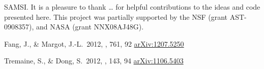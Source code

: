 \documentclass[12pt,preprint]{aastex}
\begin{document}
\acknowledgments
SAMSI. %
It is a pleasure to thank
    \ldots
for helpful contributions to the ideas and code presented here.
This project was partially supported by the NSF (grant AST-0908357), and NASA
(grant NNX08AJ48G).

\newcommand{\arxiv}[1]{\href{http://arxiv.org/abs/#1}{arXiv:#1}}
\begin{thebibliography}{}\raggedright

Fang, J., \& Margot, J.-L.\ 2012, \apj, 761, 92
\arxiv{1207.5250}

Tremaine, S., \& Dong, S.\ 2012, \aj, 143, 94
\arxiv{1106.5403}

\end{thebibliography}
\end{document}
